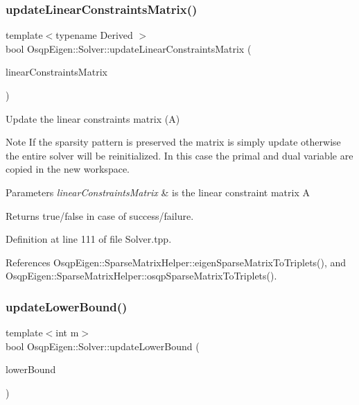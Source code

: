\subsubsection{\texorpdfstring{update\+Linear\+Constraints\+Matrix()}{updateLinearConstraintsMatrix()}\hspace{0.1cm}{\footnotesize\ttfamily [2/2]}}
{\footnotesize\ttfamily template$<$typename Derived $>$ \\
bool Osqp\+Eigen\+::\+Solver\+::update\+Linear\+Constraints\+Matrix (\begin{DoxyParamCaption}\item[{const Eigen\+::\+Sparse\+Compressed\+Base$<$ Derived $>$ \&}]{linear\+Constraints\+Matrix }\end{DoxyParamCaption})}



Update the linear constraints matrix (A) 

\begin{DoxyNote}{Note}
If the sparsity pattern is preserved the matrix is simply update otherwise the entire solver will be reinitialized. In this case the primal and dual variable are copied in the new workspace.
\end{DoxyNote}

\begin{DoxyParams}{Parameters}
{\em linear\+Constraints\+Matrix} & is the linear constraint matrix A \\
\hline
\end{DoxyParams}
\begin{DoxyReturn}{Returns}
true/false in case of success/failure. 
\end{DoxyReturn}


Definition at line 111 of file Solver.\+tpp.



References Osqp\+Eigen\+::\+Sparse\+Matrix\+Helper\+::eigen\+Sparse\+Matrix\+To\+Triplets(), and Osqp\+Eigen\+::\+Sparse\+Matrix\+Helper\+::osqp\+Sparse\+Matrix\+To\+Triplets().

\mbox{\label{classOsqpEigen_1_1Solver_a48764153cec5e618021ab79586cc71b6}} 
\subsubsection{\texorpdfstring{update\+Lower\+Bound()}{updateLowerBound()}\hspace{0.1cm}{\footnotesize\ttfamily [1/2]}}
{\footnotesize\ttfamily template$<$int m$>$ \\
bool Osqp\+Eigen\+::\+Solver\+::update\+Lower\+Bound (\begin{DoxyParamCaption}\item[{Eigen\+::\+Matrix$<$ c\+\_\+float, m, 1 $>$ \&}]{lower\+Bound }\end{DoxyParamCaption})}



